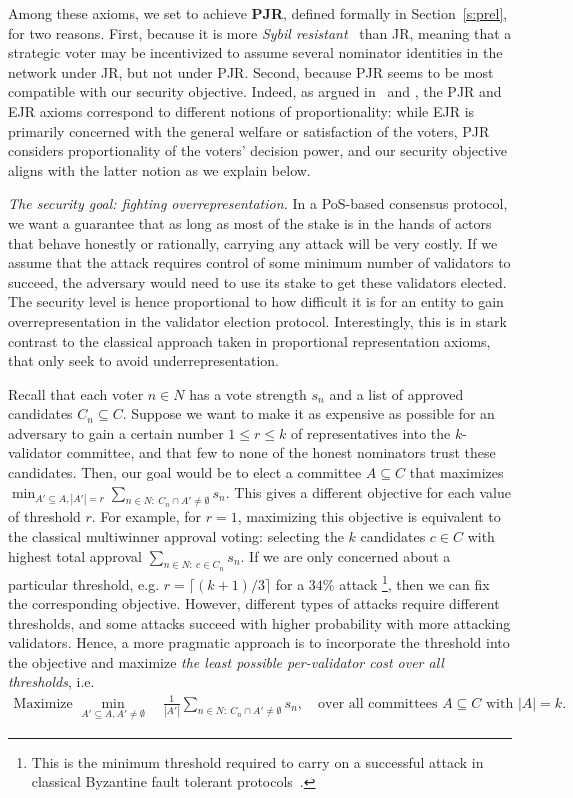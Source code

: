Among these axioms, we set to achieve \textbf{PJR}, defined formally in Section~\ref{s:prel}, for two reasons. 
First, because it is more \emph{Sybil resistant}~\cite{douceur2002sybil} than JR, meaning that a strategic voter may be incentivized to assume several nominator identities in the network under JR, but not under PJR. 
Second, because PJR seems to be most compatible with our security objective. Indeed, as argued in~\cite{peters2019proportionality} and \cite{lackner2020approval}, the PJR and EJR axioms correspond to different notions of proportionality: while EJR is primarily concerned with the general welfare or satisfaction of the voters, PJR considers proportionality of the voters' decision power, and our security objective aligns with the latter notion as we explain below.

\emph{The security goal: fighting overrepresentation.} 
In a PoS-based consensus protocol, we want a guarantee that as long as most of the stake is in the hands of actors that behave honestly or rationally, carrying any attack will be very costly. If we assume that the attack requires control of some minimum number of validators to succeed, the adversary would need to use its stake to get these validators elected. The security level is hence proportional to how difficult it is for an entity to gain overrepresentation in the validator election protocol. 
Interestingly, this is in stark contrast to the classical approach taken in proportional representation axioms, that only seek to avoid underrepresentation. 

Recall that each voter $n\in N$ has a vote strength $s_n$ and a list of approved candidates $C_n\subseteq C$. 
Suppose we want to make it as expensive as possible for an adversary to gain a certain number $1\leq r\leq k$ of representatives into the $k$-validator committee, and that few to none of the honest nominators trust these candidates. Then, our goal would be to elect a committee $A\subseteq C$ that maximizes 
$\min_{A'\subseteq A, |A'|=r} \sum_{n\in N: \ C_n\cap A'\neq \emptyset} s_n$.
This gives a different objective for each value of threshold $r$. 
For example, for $r=1$, maximizing this objective is equivalent to the classical multiwinner approval voting: selecting the $k$ candidates $c\in C$ with highest total approval $\sum_{n\in N: \ c\in C_n} s_n$. 
If we are only concerned about a particular threshold, e.g. $r=\lceil(k+1)/3\rceil$ for a $34\%$ attack%
\footnote{This is the minimum threshold required to carry on a successful attack in classical Byzantine fault tolerant protocols~\cite{pease1980reaching}.}, 
then we can fix the corresponding objective. However, different types of attacks require different thresholds, and some attacks succeed with higher probability with more attacking validators. Hence, a more pragmatic approach is to incorporate the threshold into the objective and maximize \emph{the least possible per-validator cost over all thresholds}, i.e.  
\begin{align}\label{eq:security}
    \text{Maximize } \min_{A'\subseteq A, A'\neq \emptyset} \quad \frac{1}{|A'|} \sum_{n\in N: \ C_n\cap A' \neq \emptyset} s_n, \quad \text{over all committees $A\subseteq C$ with $|A|=k$}.
\end{align}

